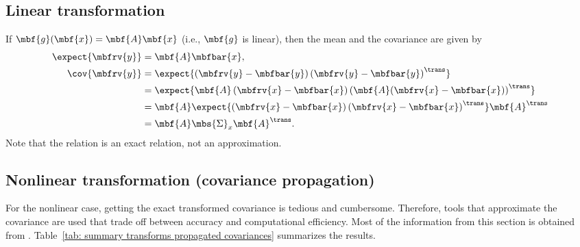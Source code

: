 \subsection{Linear transformation}
If $\mbf{g}(\mbf{x})=\mbf{A}\mbf{x}$ (i.e., $\mbf{g}$ is linear), then the mean and the covariance are given by
\begin{align}
    \expect{\mbfrv{y}} &= \mbf{A}\mbfbar{x},\\
    \cov{\mbfrv{y}} &= \expect{\left(\mbfrv{y}-\mbfbar{y}\right)\left(\mbfrv{y}-\mbfbar{y}\right)^{\trans}}\\
    &= \expect{\mbf{A}\left(\mbfrv{x}-\mbfbar{x}\right)\left(\mbf{A}(\mbfrv{x}-\mbfbar{x})\right)^{\trans}}\\
    &= \mbf{A}\expect{\left(\mbfrv{x}-\mbfbar{x}\right)\left(\mbfrv{x}-\mbfbar{x}\right)^{\trans}}\mbf{A}^{\trans}\\
    &= \mbf{A}\mbs{\Sigma}_{x}\mbf{A}^{\trans}.
\end{align}
Note that the relation is an exact relation, not an approximation.

\subsection{Nonlinear transformation (covariance propagation)}
For the nonlinear case, getting the exact transformed covariance is tedious and cumbersome. Therefore, tools that approximate the covariance are used that trade off between accuracy and computational efficiency. Most of the information from this section is obtained from \cite{gustafsson_nonlinear_2008}. Table~\ref{tab: summary transforms propagated covariances} summarizes the results.

